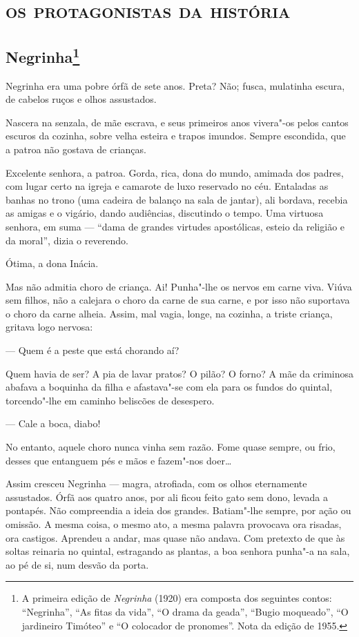 \part{\textsc{os protagonistas da história}}

\chapter{Negrinha\footnote[*]{A primeira edição
  de \emph{Negrinha} (1920) era composta dos seguintes contos:
  ``Negrinha'', ``As fitas da vida'', ``O drama da geada'', ``Bugio
  moqueado'', ``O jardineiro Timóteo'' e ``O colocador de pronomes''.
  Nota da edição de 1955.}}

Negrinha era uma pobre órfã de sete anos. Preta? Não; fusca, mulatinha
escura, de cabelos ruços e olhos assustados.

Nascera na senzala, de mãe escrava, e seus primeiros anos vivera"-os
pelos cantos escuros da cozinha, sobre velha esteira e trapos imundos.
Sempre escondida, que a patroa não gostava de crianças.

Excelente senhora, a patroa. Gorda, rica, dona do mundo, amimada dos
padres, com lugar certo na igreja e camarote de luxo reservado no céu.
Entaladas as banhas no trono (uma cadeira de balanço na sala de jantar),
ali bordava, recebia as amigas e o vigário, dando audiências, discutindo
o tempo. Uma virtuosa senhora, em suma --- ``dama de grandes virtudes
apostólicas, esteio da religião e da moral'', dizia o reverendo.

Ótima, a dona Inácia.

Mas não admitia choro de criança. Ai! Punha"-lhe os nervos em carne viva.
Viúva sem filhos, não a calejara o choro da carne de sua carne, e por
isso não suportava o choro da carne alheia. Assim, mal vagia, longe, na
cozinha, a triste criança, gritava logo nervosa:

--- Quem é a peste que está chorando aí?

Quem havia de ser? A pia de lavar pratos? O pilão? O forno? A mãe da
criminosa abafava a boquinha da filha e afastava"-se com ela para os
fundos do quintal, torcendo"-lhe em caminho beliscões de desespero.

--- Cale a boca, diabo!

No entanto, aquele choro nunca vinha sem razão. Fome quase sempre, ou
frio, desses que entanguem pés e mãos e fazem"-nos doer\ldots{}

Assim cresceu Negrinha --- magra, atrofiada, com os olhos eternamente
assustados. Órfã aos quatro anos, por ali ficou feito gato sem dono,
levada a pontapés. Não compreendia a ideia dos grandes. Batiam"-lhe
sempre, por ação ou omissão. A mesma coisa, o mesmo ato, a mesma palavra
provocava ora risadas, ora castigos. Aprendeu a andar, mas quase não
andava. Com pretexto de que às soltas reinaria no quintal, estragando as
plantas, a boa senhora punha"-a na sala, ao pé de si, num desvão da
porta.

